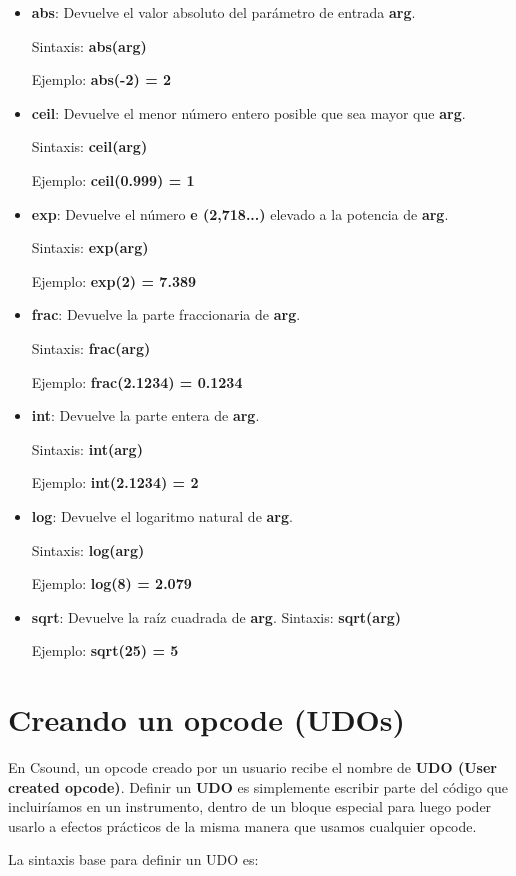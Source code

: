 \begin{itemize}
 \item \textbf{abs}: Devuelve el valor absoluto del parámetro de entrada \textbf{arg}. 
 
 Sintaxis: \textbf{abs(arg)}
 
 Ejemplo: \textbf{abs(-2) = 2}
 \item \textbf{ceil}: Devuelve el menor número entero posible que sea mayor que \textbf{arg}.
 
 Sintaxis: \textbf{ceil(arg)}
 
 Ejemplo: \textbf{ceil(0.999) = 1}
 \item \textbf{exp}: Devuelve el número \textbf{e (2,718...)} elevado a la potencia de \textbf{arg}.
 
 Sintaxis: \textbf{exp(arg)}
 
 Ejemplo: \textbf{exp(2) = 7.389}
 \item \textbf{frac}: Devuelve la parte fraccionaria de \textbf{arg}.
 
 Sintaxis: \textbf{frac(arg)}
 
 Ejemplo: \textbf{frac(2.1234) = 0.1234}
 \item \textbf{int}: Devuelve la parte entera de \textbf{arg}.
 
 Sintaxis: \textbf{int(arg)}
 
 Ejemplo: \textbf{int(2.1234) = 2}
 \item \textbf{log}: Devuelve el logaritmo natural de \textbf{arg}.
 
 Sintaxis: \textbf{log(arg)}
 
 Ejemplo: \textbf{log(8) = 2.079}
 \item \textbf{sqrt}: Devuelve la raíz cuadrada de \textbf{arg}.
 Sintaxis: \textbf{sqrt(arg)}
 
 Ejemplo: \textbf{sqrt(25) = 5}
\end{itemize}

\section{Creando un opcode (UDOs)}

En Csound, un opcode creado por un usuario recibe el nombre de \textbf{UDO (User created opcode)}. Definir un \textbf{UDO} es simplemente escribir parte del código que incluiríamos en un instrumento, dentro de un bloque especial para luego poder usarlo a efectos prácticos de la misma manera que usamos cualquier opcode.

La sintaxis base para definir un UDO es:

